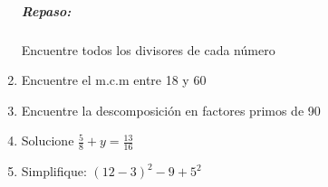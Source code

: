 \documentclass[twoside]{article}
\begin{document}
\begin{enumerate}
\subparagraph*{Repaso:} Encuentre todos los divisores de cada número
\item Encuentre el m.c.m entre 18 y 60
\item Encuentre la descomposición en factores primos de 90
\item Solucione $\frac{5}{8}+y=\frac{13}{16}$
\item Simplifique: $(12-3)^{2}-9+5^{2}$
\end{enumerate}
\end{document}
